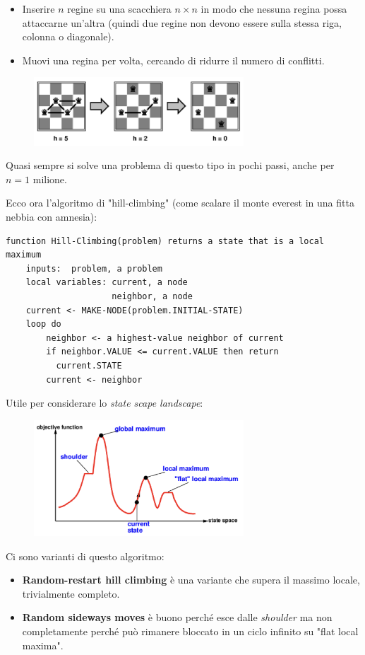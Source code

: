 \documentclass[a4paper]{article}
\begin{document}
{
  \begin{itemize}
    \item Inserire $n$ regine su una scacchiera $n \times n$ in modo che nessuna regina
      possa attaccarne un'altra (quindi due regine non devono essere sulla stessa riga, colonna o diagonale).
    \item Muovi una regina per volta, cercando di ridurre il numero di conflitti.
  \end{itemize}

  \begin{figure}[H]
    \centering
    \includegraphics[width=0.7\textwidth]{nQueens.png}
  \end{figure}
  \noindent
  Quasi sempre si solve una problema di questo tipo in pochi passi, anche per $n=1$ milione.
}
\noindent
Ecco ora l'algoritmo di "hill-climbing" (come scalare il monte everest in una fitta nebbia con amnesia):
\begin{verbatim}
function Hill-Climbing(problem) returns a state that is a local maximum
    inputs:  problem, a problem
    local variables: current, a node
                     neighbor, a node
    current <- MAKE-NODE(problem.INITIAL-STATE)
    loop do
        neighbor <- a highest-value neighbor of current
        if neighbor.VALUE <= current.VALUE then return 
          current.STATE
        current <- neighbor
\end{verbatim}
\noindent
Utile per considerare lo \textit{state scape landscape}:
\begin{figure}[H]
  \centering
  \includegraphics[width=0.7\textwidth]{hill-climbing.png}
\end{figure}
\noindent
Ci sono varianti di questo algoritmo:
\begin{itemize}
  \item \textbf{Random-restart hill climbing} è una variante che supera il massimo locale, trivialmente completo.
  \item \textbf{Random sideways moves} è buono perché esce dalle \textit{shoulder} ma non completamente perché può rimanere bloccato in un ciclo infinito su "flat local maxima". 
\end{itemize}
\end{document}
